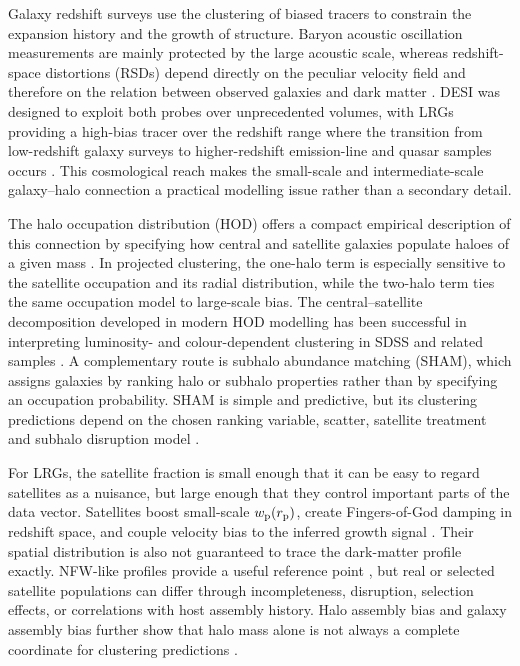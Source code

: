 \documentclass[fleqn,usenatbib]{mnras}
\newcommand{\wproj}{w_{\rm p}}
\begin{document}
Galaxy redshift surveys use the clustering of biased tracers to constrain the expansion history and the growth of structure.  Baryon acoustic oscillation measurements are mainly protected by the large acoustic scale, whereas redshift-space distortions (RSDs) depend directly on the peculiar velocity field and therefore on the relation between observed galaxies and dark matter \citep{Kaiser1987,Hamilton1998,PeacockDodds1994}.  DESI was designed to exploit both probes over unprecedented volumes, with LRGs providing a high-bias tracer over the redshift range where the transition from low-redshift galaxy surveys to higher-redshift emission-line and quasar samples occurs \citep{DESI2016,DESI2024BAO,DESI2024Samples}.  This cosmological reach makes the small-scale and intermediate-scale galaxy--halo connection a practical modelling issue rather than a secondary detail.

The halo occupation distribution (HOD) offers a compact empirical description of this connection by specifying how central and satellite galaxies populate haloes of a given mass \citep{PeacockSmith2000,Seljak2000,Berlind2002}.  In projected clustering, the one-halo term is especially sensitive to the satellite occupation and its radial distribution, while the two-halo term ties the same occupation model to large-scale bias.  The central--satellite decomposition developed in modern HOD modelling has been successful in interpreting luminosity- and colour-dependent clustering in SDSS and related samples \citep{Kravtsov2004,Zheng2005,Zheng2007,Zehavi2011}.  A complementary route is subhalo abundance matching (SHAM), which assigns galaxies by ranking halo or subhalo properties rather than by specifying an occupation probability.  SHAM is simple and predictive, but its clustering predictions depend on the chosen ranking variable, scatter, satellite treatment and subhalo disruption model \citep{ValeOstriker2004,Conroy2006,Reddick2013,ChavesMontero2016}.

For LRGs, the satellite fraction is small enough that it can be easy to regard satellites as a nuisance, but large enough that they control important parts of the data vector.  Satellites boost small-scale $\wproj(r_{\rm p})$, create Fingers-of-God damping in redshift space, and couple velocity bias to the inferred growth signal \citep{Tinker2007,Guo2015Velocity,Guo2015RSD}.  Their spatial distribution is also not guaranteed to trace the dark-matter profile exactly.  NFW-like profiles provide a useful reference point \citep{Navarro1996}, but real or selected satellite populations can differ through incompleteness, disruption, selection effects, or correlations with host assembly history.  Halo assembly bias and galaxy assembly bias further show that halo mass alone is not always a complete coordinate for clustering predictions \citep{Gao2005,Wechsler2006,Hearin2016}.
\end{document}
